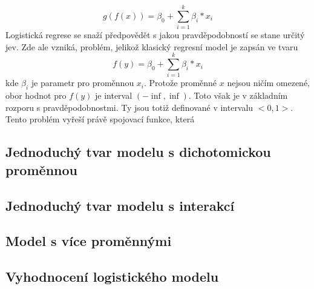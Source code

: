 \begin{equation}
    g(f(x)) = \beta_0 + \sum_{i=1}^k \beta_i*x_i
\end{equation} 
Logistická regrese se snaží předpovědět s jakou pravděpodobností se stane určitý jev. Zde ale vzniká, problém, jelikož klasický regresní model je zapsán ve tvaru
\begin{equation}
    f(y) = \beta_0 + \sum_{i=1}^k \beta_i * x_i
\end{equation} 
kde $\beta_i$ je parametr pro proměnnou $x_i$. Protože proměnné $x$ nejsou ničím omezené, obor hodnot pro $f(y)$ je interval $(-\inf, \inf)$. Toto však je v základním rozporu
s pravděpodobnostmi. Ty jsou totiž definované v intervalu $<0, 1>$. Tento problém vyřeší právě spojovací funkce, která  

\subsection{Jednoduchý tvar modelu s dichotomickou proměnnou}
\subsection{Jednoduchý tvar modelu s interakcí}
\subsection{Model s více proměnnými}
\subsection{Vyhodnocení logistického modelu}
